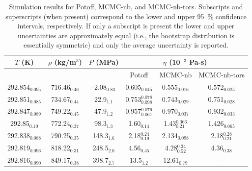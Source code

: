 \documentclass[preprint,review,12pt]{elsarticle}
\begin{document}
	\begin{table}[htb!]
		\caption{Simulation results for Potoff, MCMC-nb, and MCMC-nb-tors. Subscripts and superscripts (when present) correspond to the lower and upper 95~\% confidence intervals, respectively. If only a subscript is present the lower and upper uncertainties are approximately equal (i.e., the bootstrap distribution is essentially symmetric) and only the average uncertainty is reported.} \label{tab:tabulated_values}
		\begin{center}
			\begin{tabular}{|c|c|c|c|c|c|}
				\hline
				\multicolumn{1}{|c}{$T$ (K)} & \multicolumn{1}{|c}{$\rho$ (kg/m$^3$)} & \multicolumn{1}{|c}{$P$ (MPa)} & \multicolumn{3}{|c|}{$\eta$ (10$^{-3}$ Pa-s)} \\ \hline
				 &  &  & Potoff & MCMC-nb & MCMC-nb-tors \\ \hline 
				292.854$_{0.095}$ & 	716.46$_{0.46}$ & 	-2.08$_{0.83}$ & 	0.605$_{0.045}$ & 	0.555$_{0.016}$ & 	0.572$_{0.025}$ \\
				292.851$_{0.085}$ & 	734.67$_{0.44}$ & 	22.9$_{1.1}$ & 	0.753$^{0.078}_{0.098}$ & 	0.743$_{0.029}$ & 	0.751$_{0.028}$ \\
				292.847$_{0.089}$ & 	749.22$_{0.45}$ & 	47.9$_{1.2}$ & 	0.957$^{0.076}_{0.061}$ & 	0.970$_{0.037}$ & 	0.932$_{0.033}$ \\
				292.85$_{0.10}$ & 	772.24$_{0.37}$ & 	98.3$_{1.3}$ & 	1.60$_{0.14}$ & 	1.43$^{0.066}_{0.21}$ & 	1.426$_{0.065}$ \\
				292.838$_{0.088}$ & 	790.25$_{0.35}$ & 	148.3$_{1.6}$ & 	2.18$^{0.24}_{0.19}$ & 	2.134$_{0.098}$ & 	2.18$^{0.28}_{0.21}$ \\
				292.819$_{0.096}$ & 	818.22$_{0.31}$ & 	248.5$_{2.0}$ & 	4.56$_{0.45}$ & 	4.28$^{0.34}_{0.52}$ & 	4.36$_{0.38}$ \\
				292.816$_{0.090}$ & 	849.17$_{0.38}$ & 	398.7$_{2.7}$ & 	13.5$_{1.2}$ & 	12.61$_{0.79}$ & 	-- \\

\end{tabular}
\end{center}
\end{table}
\end{document}
